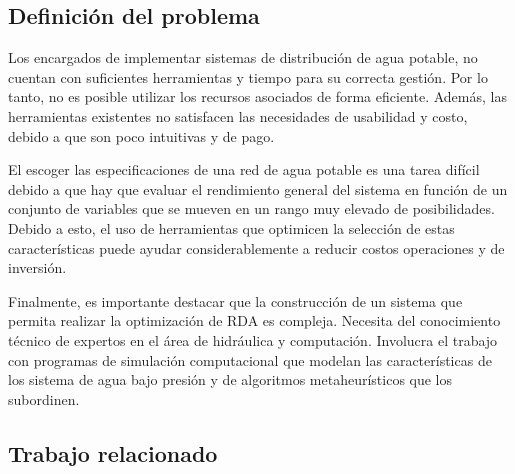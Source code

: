 \documentclass[11pt,letterpaper]{article}
\begin{document}
\subsection{Definición del problema} 

Los encargados de implementar sistemas de distribución de agua potable, no cuentan con suficientes herramientas y tiempo para su correcta gestión. Por lo tanto, no es posible utilizar los recursos asociados de forma eficiente. Además, las herramientas existentes no satisfacen las necesidades de usabilidad y costo, debido a que son poco intuitivas y de pago.

El escoger las especificaciones de una red de agua potable es una tarea difícil debido a que hay que evaluar el rendimiento general del sistema en función de un conjunto de variables que se mueven en un rango muy elevado de posibilidades. Debido a esto, el uso de herramientas que optimicen la selección de estas características puede ayudar considerablemente a reducir costos operaciones y de inversión.

Finalmente, es importante destacar que la construcción de un sistema que permita realizar la optimización de RDA es compleja. Necesita del conocimiento técnico de expertos en el área de hidráulica y computación. Involucra el trabajo con programas de simulación computacional que modelan las características de los sistema de agua bajo presión y de algoritmos metaheurísticos que los subordinen.   





\subsection{Trabajo relacionado} 
\end{document}
